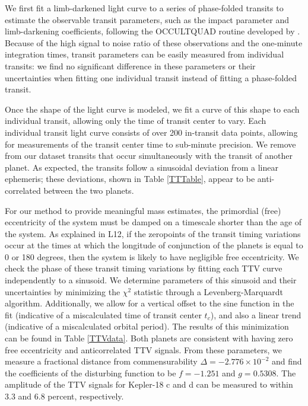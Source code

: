 We first fit a limb-darkened light curve to a series of phase-folded transits to estimate the observable transit parameters, such as the impact parameter and limb-darkening coefficients, following the OCCULTQUAD routine developed by \citet{Mandel02}. Because of the high signal to noise ratio of these observations and the one-minute integration times, transit parameters can be easily measured from individual transits: we find no significant difference in these parameters or their uncertainties when fitting one individual transit instead of fitting a phase-folded transit. 

Once the shape of the light curve is modeled, we fit a curve of this shape to each individual transit, allowing only the time of transit center to vary. Each individual transit light curve consists of over 200 in-transit data points, allowing for measurements of the transit center time to sub-minute precision. We remove from our dataset transits that occur simultaneously with the transit of another planet. As expected, the transits follow a sinusoidal deviation from a linear ephemeris; these deviations, shown in Table \ref{TTTable}, appear to be anti-correlated between the two planets.


For our method to provide meaningful mass estimates, the primordial (free) eccentricity of the system must be damped on a timescale shorter than the age of the system. As explained in L12, if the zeropoints of the transit timing variations occur at the times at which the longitude of conjunction of the planets is equal to 0 or 180 degrees, then the system is likely to have negligible free eccentricity. We check the phase of these transit timing variations by fitting each TTV curve independently to a sinusoid. We determine parameters of this sinusoid and their uncertainties by minimizing the $\chi^2$ statistic through a Levenberg-Marquardt algorithm. Additionally, we allow for a vertical offset to the sine function in the fit (indicative of a miscalculated time of transit center $t_c$), and also a linear trend (indicative of a miscalculated orbital period). The results of this minimization can be found in Table \ref{TTVdata}. Both planets are consistent with having zero free eccentricity and anticorrelated TTV signals. From these parameters, we measure a fractional distance from commensurability $\Delta = -2.776 \times 10^{-2}$ and find the coefficients of the disturbing function to be $f = -1.251$ and $g = 0.5308$. The amplitude of the TTV signals for Kepler-18 c and d can be measured to within 3.3 and 6.8 percent, respectively. 

